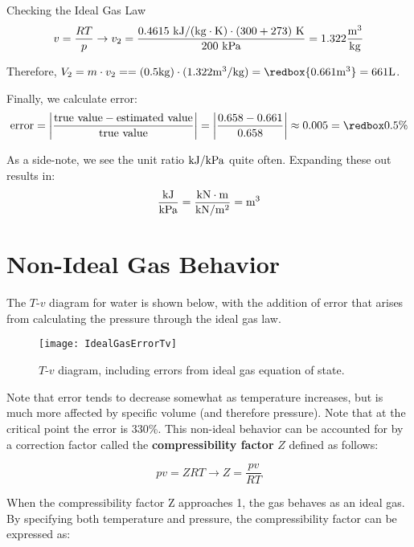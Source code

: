 \begin{example}{Checking the Ideal Gas Law}
\begin{equation*}
  v = \frac{RT}{p} \rightarrow v_2 = \frac{0.4615\ {\rm kJ/(kg\cdot K)} \cdot (300 + 273)\ {\rm K}}{200 \rm\ kPa} = 1.322 \frac{\rm m^3}{\rm kg}
\end{equation*}

Therefore, $V_2 = m\cdot v_2 = = (0.5{\rm kg})\cdot (1.322 {\rm m^3/kg}) = \redbox{0.661 {\rm m^3}} = 661 {\rm L}$.

Finally, we calculate error:
\begin{equation*}
  {\rm error} = \left|\frac{\rm true\ value - estimated\ value}{\rm true\ value}\right| = \left|\frac{0.658 - 0.661}{0.658}\right|\approx 0.005 = \redbox{0.5\%}
\end{equation*}

\end{example}

As a side-note, we see the unit ratio $\rm kJ / kPa$ quite often.  Expanding these out results in:
\begin{equation*}
  \frac{\rm kJ}{\rm kPa} = \frac{\rm kN\cdot m}{\rm kN / m^2} = {\rm m}^3
\end{equation*}

\section{Non-Ideal Gas Behavior}
The $T$-$v$ diagram for water is shown below, with the addition of error that arises from calculating the pressure through the ideal gas law.

\begin{figure}[H]
\centering
\texttt{[image: IdealGasErrorTv]}
\caption{$T$-$v$ diagram, including errors from ideal gas equation of state.}
\label{fig:ch2_Tv-ideal}
\end{figure}

Note that error tends to decrease somewhat as temperature increases, but is much more affected by specific volume (and therefore pressure). Note that at the critical point the error is 330\%.  This non-ideal behavior can be accounted for by a correction factor called the {\bf compressibility factor} $Z$ defined as follows:

\begin{equation}
  pv = ZRT \rightarrow Z = \frac{pv}{RT}
\end{equation}

When the compressibility factor Z approaches 1, the gas behaves as an ideal gas. By specifying both temperature and pressure, the compressibility factor can be expressed as:

